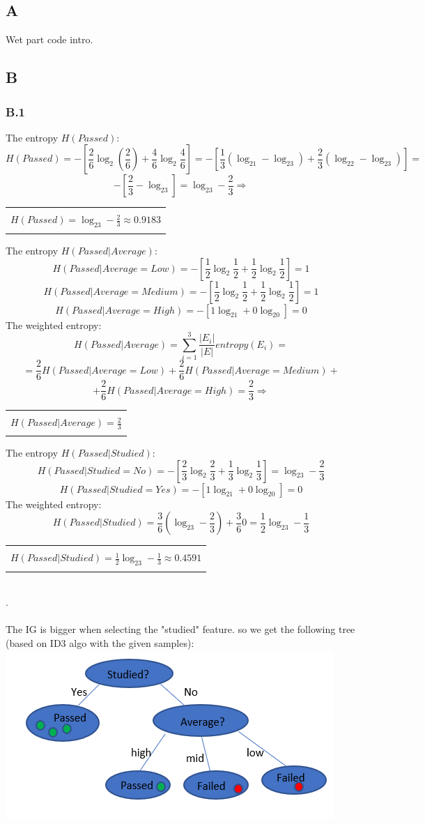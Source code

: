 \documentclass[12pt]{article}
\newcommand{\rectres}[1]{
\begin{center}
\begin{tabular}{ |c| }
\hline\\
#1\\
\\
\hline
\end{tabular}
\end{center}
}
\begin{document}
\subsection*{A}
Wet part code intro.

\subsection*{B}
\subsubsection*{B.1}
The entropy $H(Passed)$:
$$H(Passed)= -[\frac{2}{6}\log_2(\frac{2}{6}) + \frac{4}{6}\log_2\frac{4}{6}] = -[\frac{1}{3}(\log_21- \log_23) + \frac{2}{3}(\log_22 - \log_23)]=$$ 
$$-[\frac{2}{3} - \log_23] = \log_23 - \frac{2}{3} \Rightarrow$$
\rectres{$H(Passed)=\log_23 - \frac{2}{3} \approx 0.9183$}
The entropy $H(Passed|Average)$:
$$H(Passed|Average=Low)= -[\frac{1}{2}\log_2\frac{1}{2} +\frac{1}{2}\log_2\frac{1}{2}] = 1$$ 
$$H(Passed|Average=Medium)= -[\frac{1}{2}\log_2\frac{1}{2} +\frac{1}{2}\log_2\frac{1}{2}] = 1$$ 
$$H(Passed|Average=High)= -[1\log_21 + 0\log_20] = 0$$ 
The weighted entropy:
$$H(Passed|Average)=\sum_{i=1}^3\frac{|E_i|}{|E|}entropy(E_i)=$$ $$=\frac{2}{6}H(Passed|Average=Low) + \frac{2}{6}H(Passed|Average=Medium)+$$
$$+\frac{2}{6}H(Passed|Average=High)=\frac{2}{3}\Rightarrow$$
\rectres{$H(Passed|Average)=\frac{2}{3}$}
The entropy $H(Passed|Studied)$:
$$H(Passed|Studied=No)= -[\frac{2}{3}\log_2\frac{2}{3} +\frac{1}{3}\log_2\frac{1}{3}] = \log_23 - \frac{2}{3}$$ 
$$H(Passed|Studied=Yes)= -[1\log_21 + 0\log_20] = 0$$ 
The weighted entropy:
$$H(Passed|Studied)=\frac{3}{6}(\log_23 - \frac{2}{3}) + \frac{3}{6}0= \frac{1}{2}\log_23 - \frac{1}{3}$$ 
\rectres{$H(Passed|Studied)=\frac{1}{2}\log_23 - \frac{1}{3} \approx 0.4591$}
\newpage\\
.\\
\\
The IG is bigger when selecting the "studied" feature. so we get the following tree (based on ID3 algo with the given samples):\\
\includegraphics[]{hw3/plots/tree.PNG}
\end{document}
